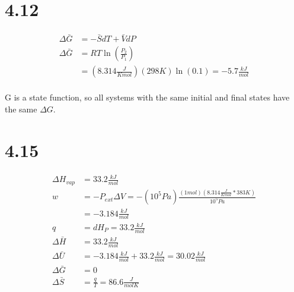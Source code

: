 \documentclass[10pt]{article} %
\begin{document}
\section{4.12}
\begin{align*}
  \Delta \bar{G} &= -\bar{S}dT + \bar{V}dP\\
  \Delta \bar{G} &= RT\ln\left(\frac{P_2}{P_1}\right)\\
  &= (8.314 \frac{J}{K mol})(298K)\ln(0.1) = -5.7 \frac{kJ}{mol}\\
\end{align*}

G is a state function, so all systems with the same initial and final states have the same $\Delta G$.

\section{4.15}
\begin{align*}
  \Delta H_{vap} &= 33.2 \frac{kJ}{mol}\\
  w &= -P_{ext}\Delta V = -(10^5 Pa)\frac{(1 mol)(8.314 \frac{J}{K mol} * 383 K)}{10^5 Pa}\\
  &= -3.184 \frac{kJ}{mol}\\
  q &= dH_P = 33.2 \frac{kJ}{mol}\\
  \Delta \bar{H} &= 33.2 \frac{kJ}{mol}\\
  \Delta \bar{U} &= -3.184 \frac{kJ}{mol} + 33.2 \frac{kJ}{mol} = 30.02 \frac{kJ}{mol}\\
  \Delta \bar{G} &= 0\\
  \Delta \bar{S} &= \frac{q}{T} = 86.6 \frac{J}{mol K}\\
\end{align*}
\end{document}

